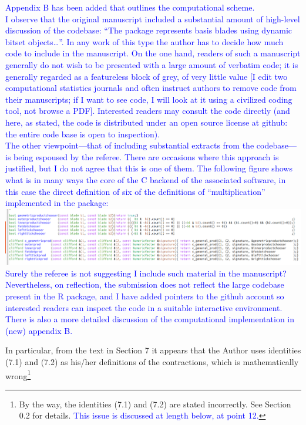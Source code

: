 \documentclass{article}
\begin{document}
\begin{itemize}
    \textcolor{blue}{Appendix B has been added that outlines the
      computational scheme.\\I observe that the original manuscript included a
      substantial amount of high-level discussion of the codebase:
      ``The package represents basis blades using dynamic bitset
      objects\ldots''.  In any work of this type the author has to
      decide how much code to include in the manuscript.  On the one
      hand, readers of such a manuscript generally do not wish to be
      presented with a large amount of verbatim code; it is generally
      regarded as a featureless block of grey, of very little value [I
        edit two computational statistics journals and often instruct
        authors to remove code from their manuscripts; if I want to
        see code, I will look at it using a civilized coding tool, not
        browse a PDF].  Interested readers may consult the code
      directly (and here, as stated, the code is distributed under an
      open source license at github: the entire code base is open to
      inspection).\\[10pt] The other viewpoint---that of including
      substantial extracts from the codebase---is being espoused by
      the referee.  There are occasions where this approach is
      justified, but I do not agree that this is one of them.  The
      following figure shows what is in many ways the core of the C
      backend of the associated software, in this case the direct
      definition of six of the definitions of ``multiplication''
      implemented in the package:\\[10pt]
      \includegraphics[width=6in]{code.png}\\[10pt] Surely the referee
      is not suggesting I include such material in the manuscript?
      Nevertheless, on reflection, the submission does not reflect the
      large codebase present in the R package, and I have added
      pointers to the github account so interested readers can inspect
      the code in a suitable interactive environment.  There is also a
      more detailed discussion of the computational implementation in
      (new) appendix B.}

    In particular, from the text in Section 7 it appears that the
    Author uses identities (7.1) and (7.2) as his/her definitions of
    the contractions, which is mathematically wrong\footnote{By the
    way, the identities (7.1) and (7.2) are stated incorrectly.  See
    Section 0.2 for details. \textcolor{blue}{This issue is discussed
      at length below, at point 12.}}


\end{itemize}
\end{document}
